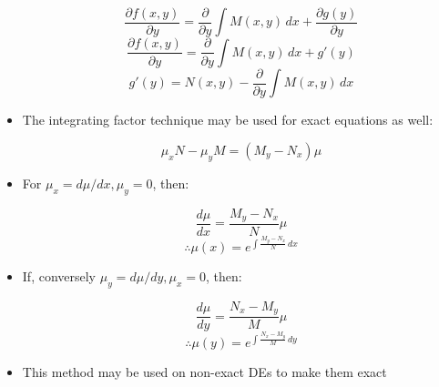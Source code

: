\documentclass[12pt]{article}
\begin{document}
\begin{itemize}
    
    $$\frac{\partial f(x,y)}{\partial y}=\frac{\partial}{\partial y}\int M(x,y)\,dx+ \frac{\partial g(y)}{\partial y}$$
    $$\frac{\partial f(x,y)}{\partial y}=\frac{\partial}{\partial y}\int M(x,y)\,dx+ g'(y)$$
    $$g'(y)=N(x,y)-\frac{\partial}{\partial y}\int M(x,y)\,dx$$

  \item The integrating factor technique may be used for exact equations as well:

    $$\mu_xN-\mu_yM=(M_y-N_x)\mu$$

  \item For $\mu_x=d\mu/dx, \mu_y=0$, then:

    $$\frac{d\mu}{dx}=\frac{M_y-N_x}{N}\mu$$
    $$\therefore \mu(x)=e^{\int\frac{M_y-N_x}{N}\,dx}$$

\item If, conversely $\mu_y=d\mu/dy, \mu_x=0$, then:
  
    $$\frac{d\mu}{dy}=\frac{N_x-M_y}{M}\mu$$
    $$\therefore \mu(y)=e^{\int\frac{N_x-M_y}{M}\,dy}$$
    
  \item This method may be used on non-exact DEs to make them exact

\end{itemize}
\end{document}

